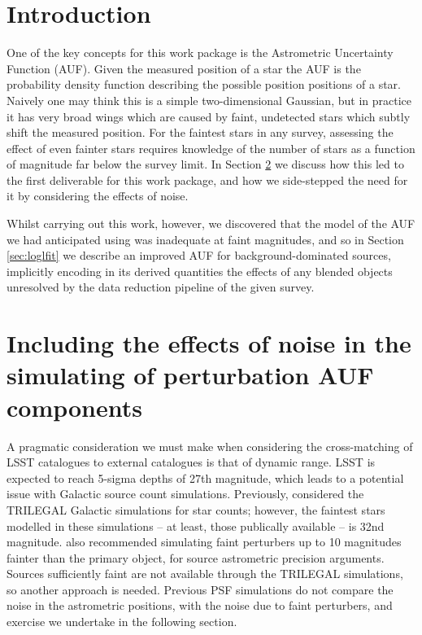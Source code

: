 \documentclass[fleqn,usenatbib]{mnras}
\begin{document}
\section{Introduction}

One of the key concepts for this work package is the Astrometric Uncertainty Function (AUF).
Given the measured position of a star the AUF is the probability density function describing the possible position positions of a star.
Naively one may think this is a simple two-dimensional Gaussian, but in practice it has very broad wings which are caused by faint, undetected stars which subtly shift the measured position.
For the faintest stars in any survey, assessing the effect of even fainter stars requires knowledge of the number of stars as a function of magnitude far below the survey limit.
In Section \ref{sec:noise effects} we discuss how this led to the first deliverable for this work package, and how we side-stepped the need for it by considering the effects of noise.

Whilst carrying out this work, however, we discovered that the model of the AUF we had anticipated using was inadequate at faint magnitudes, and so in Section \ref{sec:loglfit} we describe an improved AUF for background-dominated sources, implicitly encoding in its derived quantities the effects of any blended objects unresolved by the data reduction pipeline of the given survey.

\section{Including the effects of noise in the simulating of perturbation AUF components}
\label{sec:noise effects}
A pragmatic consideration we must make when considering the cross-matching of LSST catalogues to external catalogues is that of dynamic range. LSST is expected to reach 5-sigma depths of 27th magnitude, which leads to a potential issue with Galactic source count simulations. Previously, \citet{2018MNRAS.481.2148W} considered the TRILEGAL \citep{Girardi2005} Galactic simulations for star counts; however, the faintest stars modelled in these simulations -- at least, those publically available -- is 32nd magnitude. \citet{2018MNRAS.481.2148W} also recommended simulating faint perturbers up to 10 magnitudes fainter than the primary object, for source astrometric precision arguments. Sources sufficiently faint are not available through the TRILEGAL simulations, so another approach is needed. 
Previous PSF simulations do not compare the noise in the astrometric positions, with the noise due to faint perturbers, and exercise we undertake in the following section.
\end{document}
